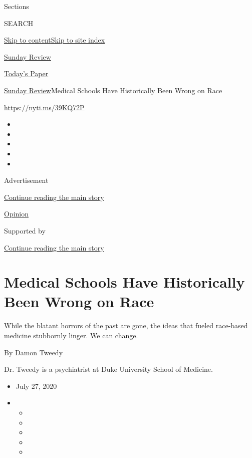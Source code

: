 Sections

SEARCH

\protect\hyperlink{site-content}{Skip to
content}\protect\hyperlink{site-index}{Skip to site index}

\href{https://www.nytimes3xbfgragh.onion/section/opinion/sunday}{Sunday
Review}

\href{https://myaccount.nytimes3xbfgragh.onion/auth/login?response_type=cookie\&client_id=vi}{}

\href{https://www.nytimes3xbfgragh.onion/section/todayspaper}{Today's
Paper}

\href{/section/opinion/sunday}{Sunday Review}\textbar{}Medical Schools
Have Historically Been Wrong on Race

\href{https://nyti.ms/39KQ72P}{https://nyti.ms/39KQ72P}

\begin{itemize}
\item
\item
\item
\item
\item
\end{itemize}

Advertisement

\protect\hyperlink{after-top}{Continue reading the main story}

\href{/section/opinion}{Opinion}

Supported by

\protect\hyperlink{after-sponsor}{Continue reading the main story}

\hypertarget{medical-schools-have-historically-been-wrong-on-race}{%
\section{Medical Schools Have Historically Been Wrong on
Race}\label{medical-schools-have-historically-been-wrong-on-race}}

While the blatant horrors of the past are gone, the ideas that fueled
race-based medicine stubbornly linger. We can change.

By Damon Tweedy

Dr. Tweedy is a psychiatrist at Duke University School of Medicine.

\begin{itemize}
\item
  July 27, 2020
\item
  \begin{itemize}
  \item
  \item
  \item
  \item
  \item
  \end{itemize}
\end{itemize}

